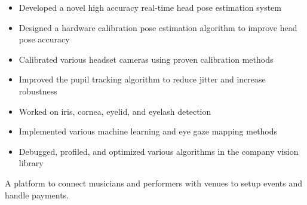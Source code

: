 \documentclass[10pt,a4paper,ragged2e,withhyper]{altacv}
\begin{document}
\begin{paracol}{2}
		\divider
		
		\begin{itemize}
			\item Developed a novel high accuracy real-time head pose estimation system
			\item Designed a hardware calibration pose estimation algorithm to improve head pose accuracy
			\item Calibrated various headset cameras using proven calibration methods
			\item Improved the pupil tracking algorithm to reduce jitter and increase robustness
			\item Worked on iris, cornea, eyelid, and eyelash detection
			\item Implemented various machine learning and eye gaze mapping methods
			\item Debugged, profiled, and optimized various algorithms in the company vision library
		\end{itemize}
		
		
		
		
		\newpage
		
		
		
		 { A platform to connect musicians and performers with venues to setup events and handle payments. }
			

\end{paracol}
\end{document}
